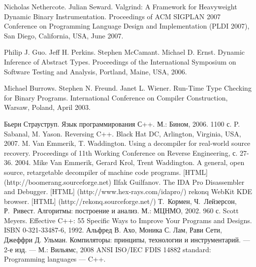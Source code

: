 \documentclass[a4paper,12pt,russian]{article}
\newcommand{\code}[1]{\textsf{#1}}
\begin{document}
\newpage
{}
\begin{thebibliography}{9}

     Nicholas Nethercote. Julian Seward. Valgrind: A Framework for Heavyweight Dynamic Binary Instrumentation. Proceedings of ACM SIGPLAN 2007 Conference on Programming Language Design and Implementation (PLDI 2007), San Diego, California, USA, June 2007.

     Philip J. Guo. Jeff H. Perkins. Stephen McCamant. Michael D. Ernst. Dynamic Inference of Abstract Types. Proceedings of the International Symposium on Software Testing and Analysis, Portland, Maine, USA, 2006.

     Michael Burrows. Stephen N. Freund. Janet L. Wiener. Run-Time Type Checking for Binary Programs. International Conference on Compiler Construction, Warsaw, Poland, April 2003.

     Бьерн Страуструп. Язык программирования С++. М.: Бином, 2006. 1100 с.
    P. Sabanal, M. Yason. Reversing C++. Black Hat DC, Arlington, Virginia, USA, 2007.
     M. Van Emmerik, T. Waddington. Using a decompiler for real-world source recovery. Proceedings of 11th Working Conference on Reverse Engineering, с. 27-36. 2004.
     Mike Van Emmerik, Gerard Krol, Trent Waddington. A general, open source, retargetable decompiler of machine code programs. [HTML] (\code{http://boomerang.sourceforge.net})
     Ilfak Guilfanov. The IDA Pro Disassembler and Debugger. [HTML] (\code{http://www.hex-rays.com/idapro/})
     rekonq WebKit KDE browser. [HTML] (\code{http://rekonq.sourceforge.net/})
     Т.~Кормен, Ч.~Лейзерсон, Р.~Ривест. Алгоритмы: построение и анализ. М.: МЦНМО, 2002. 960 с.
     Scott Meyers. Effective C++: 55 Specific Ways to Improve Your Programs and Designs. ISBN 0-321-33487-6, 1992.
     Альфред В. Ахо, Моника С. Лам, Рави Сети, Джеффри Д. Ульман. Компиляторы: принципы, технологии и инструментарий. — 2-е изд. — М.: Вильямс, 2008
     ANSI ISO/IEC FDIS 14882 standard: Programming languages --- C++.
\end{thebibliography}
\end{document}
